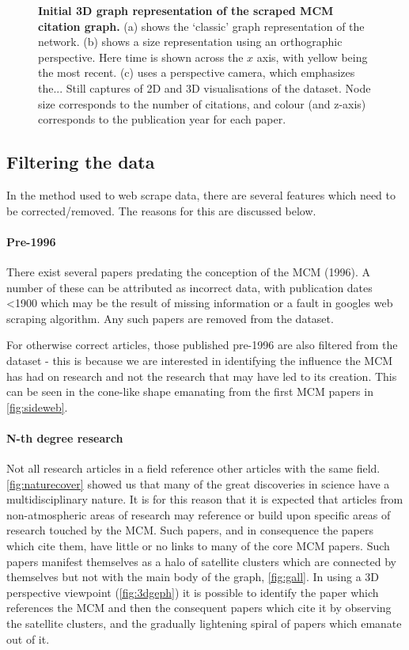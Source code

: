 \begin{figure}[H]
        \caption{ \textbf{Initial 3D graph representation of the scraped MCM citation graph.} (a) shows the `classic' graph representation of the network. (b) shows a size representation using an orthographic perspective. Here time is shown across the $x$ axis, with yellow being the most recent. (c)
        uses a perspective camera, which emphasizes the...
        Still captures of 2D and 3D visualisations of the dataset. Node size corresponds to the number of citations, and colour (and z-axis) corresponds to the publication year for each paper.}
        \label{fig:weball}

\end{figure}


\subsection{Filtering the data}\label{sec:filter3d}


In the method used to web scrape data, there are several features which need to be corrected/removed. The reasons for this are discussed below.
 
\paragraph*{Pre-1996}
There exist several papers predating the conception of the MCM (1996). A number of these can be attributed as incorrect data, with publication dates <1900 which may be the result of missing information or a fault in googles web scraping algorithm. Any such papers are removed from the dataset.

 For otherwise correct articles, those published pre-1996 are also filtered from the dataset - this is because we are interested in identifying the influence the MCM has had on research and not the research that may have led to its creation. This can be seen in the cone-like shape emanating from the first MCM papers in \autoref{fig:sideweb}.

\paragraph*{N-th degree research}
Not all research articles in a field reference other articles with the same field. \autoref{fig:naturecover} showed us that many of the great discoveries in science have a multidisciplinary nature. It is for this reason that it is expected that articles from non-atmospheric areas of research may reference or build upon specific areas of research touched by the MCM. Such papers, and in consequence the papers which cite them, have little or no links to many of the core MCM papers. Such papers manifest themselves as a halo of satellite clusters which are connected by themselves but not with the main body of the graph, \autoref{fig:gall}. In using a 3D perspective viewpoint (\autoref{fig:3dgeph}) it is possible to identify the paper which references the MCM and then the consequent papers which cite it by observing the satellite clusters, and the gradually lightening spiral of papers which emanate out of it. 

